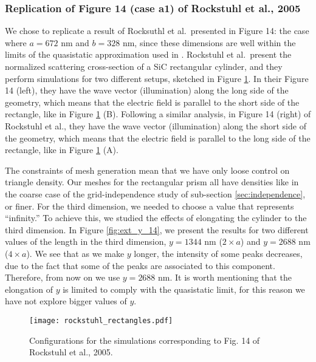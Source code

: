 \subsubsection{Replication of Figure 14 (case a1) of Rockstuhl et al., 2005}

We chose to replicate a result of Rocksuthl et al.\ presented in Figure 14: 
the case where $a=672$ nm 
and $b=328$ nm, since these dimensions are well within the limits of the quasistatic approximation 
used in \pygbe. Rockstuhl et al.\ present the normalized scattering cross-section of a SiC rectangular 
cylinder, and they perform simulations for two different setups, sketched in Figure \ref{fig:rectangle_sketch}. In 
their Figure 14 (left), they have the wave vector (illumination) along the long 
side of the geometry, which means that the electric field is parallel to the short side of the rectangle, like in 
Figure \ref{fig:rectangle_sketch} (B). Following a similar analysis, in Figure 14 (right) of Rockstuhl et al., they have the wave 
vector (illumination) along the short side of the geometry, which means that the electric field is parallel to the 
long side of the rectangle, like in Figure \ref{fig:rectangle_sketch} (A). 

The constraints of mesh generation mean that we have only loose control on triangle density. Our meshes for the rectangular prism all have densities like in the coarse case of the grid-independence study of sub-section \ref{sec:independence}, or finer.
For the third dimension, we needed to choose a value that represents ``infinity.'' To achieve this, we studied the effects of 
elongating the cylinder to the third dimension. In Figure \ref{fig:ext_y_14}, we present the results for two different
values of the length in the third dimension, $y=1344$ nm ($2\times a$) and $y=2688$ nm ($4\times a$). We see that as we make $y$ longer, the 
intensity of some peaks decreases, due to the fact that some of the peaks are associated to this component. Therefore, 
from now on we use $y=2688$ nm. It is worth mentioning that the elongation of $y$ is limited to comply with the quasistatic limit, for this reason we have not explore bigger values of $y$.


\begin{figure}
    \centering
    \texttt{[image: rockstuhl\_rectangles.pdf]} 
    \caption{Configurations for the simulations corresponding to Fig. 14 of Rockstuhl et al., 2005.}
    \label{fig:rectangle_sketch}
\end{figure}

